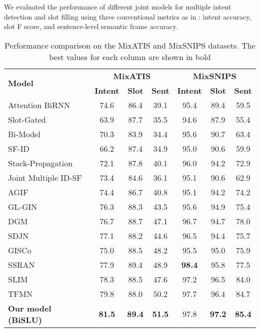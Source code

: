 \documentclass{ecai}
\begin{document}
We evaluated the performance of different joint models for multiple intent detection and slot filling using three conventional metrics as in \cite{gangadharaiah-narayanaswamy:2019}: intent accuracy, slot F score, and sentence-level semantic frame accuracy. 

\begin{table*}[t]
\centering
\caption{Performance comparison on the MixATIS and MixSNIPS datasets. The best values for each column
are shown in bold}
\label{tab:Results}
\begin{tabular}{|l|c|c|c|c|c|c|}
\hline
\multirow{2}{*}{\textbf{Model}} & \multicolumn{3}{|c|}{\textbf{MixATIS}} &	\multicolumn{3}{|c|}{\textbf{MixSNIPS}} \\
\cline{2-7}
& \textbf{Intent} &	\textbf{Slot} &	\textbf{Sent} & \textbf{Intent} &	\textbf{Slot} &	\textbf{Sent} \\
\hline
\hline
Attention BiRNN \cite{liu:2016}&	74.6 &	86.4 &	39.1 &	95.4 &	89.4 &	59.5\\
\hline
Slot-Gated \cite{Goo:2018}& 63.9&	87.7	&35.5	&94.6	&87.9	&55.4\\
\hline
Bi-Model \cite{wang:2018} & 70.3 & 	83.9 & 	34.4 & 	95.6 & 	90.7 & 	63.4\\
\hline
SF-ID \cite{Haihong:2019} & 66.2 & 	87.4 & 	34.9 & 	95.0 & 	90.6 & 	59.9\\
\hline
Stack-Propagation \cite{Qin:2019}& 72.1 & 	87.8 & 	40.1 & 	96.0 & 	94.2 & 	72.9\\
\hline
Joint Multiple ID-SF \cite{gangadharaiah-narayanaswamy:2019} &	73.4 &		84.6 &		36.1 &		95.1 &		90.6 &		62.9\\
\hline
AGIF \cite{qin:2020}& 74.4 & 	86.7 & 	40.8 & 	95.1 & 	94.2 & 	74.2\\
\hline
GL-GIN \cite{qin:2021}&76.3 &	88.3 &	43.5 &	95.6 &	94.9 &	75.4\\
\hline
DGM \cite{ding:2021}&76.7 &	88.7 &	47.1 &	96.7 &	94.7 &	78.0\\
\hline
SDJN \cite{chen:2022} &77.1 &	88.2 &	44.6 &	96.5 &	94.4 &	75.7\\
\hline
GISCo \cite{song:2022} &75.0 &	88.5 &	48.2 &	95.5 &	95.0&	75.9 \\
\hline
SSRAN \cite{cheng:2023} &77.9 &	89.4 &	48.9 &	\textbf{98.4} &	95.8&	77.5 \\
\hline
SLIM \cite{cai:2022}&78.3 &	88.5 &	47.6 &	97.2 &	96.5&	84.0 \\
\hline
TFMN \cite{chen-coling:2022}  & 79.8 &	88.0 &	50.2 &	97.7 &	96.4 &	84.7 \\
\hline
\hline
\textbf{Our model (BiSLU)} &	\textbf{81.5} &	\textbf{89.4} &	\textbf{51.5} & 97.8 & \textbf{97.2} & \textbf{85.4}\\\hline
\end{tabular}
\end{table*}
\end{document}
